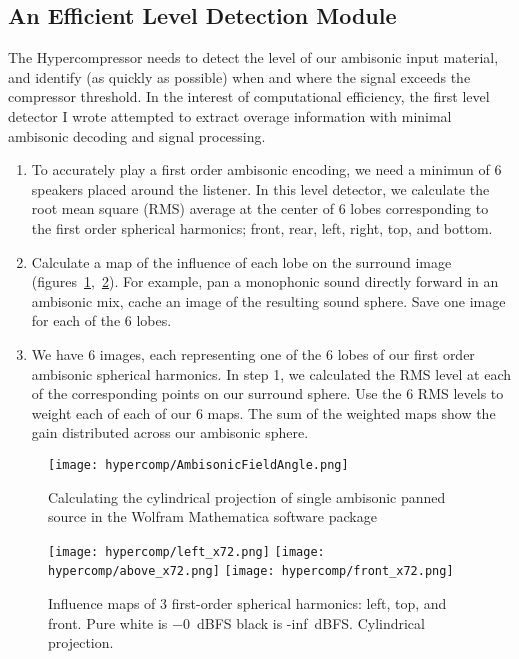 \subsection{An Efficient Level Detection Module}
\label{sec:hyperc-level-detect}
The Hypercompressor needs to detect the level of our ambisonic input
material, and identify (as quickly as possible) when and where the
signal exceeds the compressor threshold. In the interest of
computational efficiency, the first level detector I wrote attempted
to extract overage information with minimal ambisonic decoding and
signal processing.
\begin{enumerate}
\item To accurately play a first order ambisonic encoding, we need a
  minimun of 6 speakers placed around the listener. In this level
  detector, we calculate the root mean square (RMS) average at the
  center of 6 lobes corresponding to the first order spherical
  harmonics; front, rear, left, right, top, and bottom.
\item Calculate a map of the influence of each lobe on the surround
  image
  (figures~\ref{fig:hypercomp-mathematica},~\ref{fig:hypercomp-inf-maps}). For
  example, pan a monophonic sound directly forward in an ambisonic
  mix, cache an image of the resulting sound sphere. Save one image
  for each of the 6 lobes.
\item We have 6 images, each representing one of the 6 lobes of our
  first order ambisonic spherical harmonics. In step 1, we calculated
  the RMS level at each of the corresponding points on our surround
  sphere. Use the 6 RMS levels to weight each of each of our 6
  maps. The sum of the weighted maps show the gain distributed across
  our ambisonic sphere.
\end{enumerate}

\begin{figure}[]
  \texttt{[image: hypercomp/AmbisonicFieldAngle.png]}
  \caption{Calculating the cylindrical projection of single ambisonic panned
    source in the Wolfram Mathematica software package}
  \label{fig:hypercomp-mathematica}
\end{figure}

\begin{figure}[]
 \texttt{[image: hypercomp/left\_x72.png]}
 \texttt{[image: hypercomp/above\_x72.png]}
 \texttt{[image: hypercomp/front\_x72.png]}
  \caption{Influence maps of 3 first-order spherical harmonics: left, top, and
    front. Pure white is $-0$~dBFS black is -inf~dBFS. Cylindrical projection.}
  \label{fig:hypercomp-inf-maps}
\end{figure}

